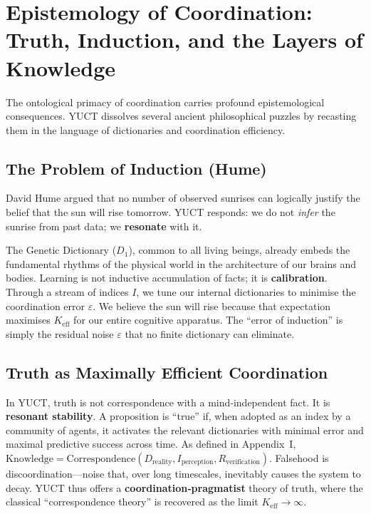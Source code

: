 \documentclass[12pt,a4paper]{article}
\newcommand{\Keff}{K_{\mathrm{eff}}}
\begin{document}
	\section{Epistemology of Coordination: Truth, Induction, and the Layers of Knowledge}
	\label{sec:epistemology}
	
	The ontological primacy of coordination carries profound epistemological consequences. YUCT dissolves several ancient philosophical puzzles by recasting them in the language of dictionaries and coordination efficiency.
	
	\subsection{The Problem of Induction (Hume)}
	
	David Hume argued that no number of observed sunrises can logically justify the belief that the sun will rise tomorrow. YUCT responds: we do not \emph{infer} the sunrise from past data; we \textbf{resonate} with it.
	
	The Genetic Dictionary (\(D_1\)), common to all living beings, already embeds the fundamental rhythms of the physical world in the architecture of our brains and bodies. Learning is not inductive accumulation of facts; it is \textbf{calibration}. Through a stream of indices \(I\), we tune our internal dictionaries to minimise the coordination error \(\varepsilon\). We believe the sun will rise because that expectation maximises \(\Keff\) for our entire cognitive apparatus. The ``error of induction'' is simply the residual noise \(\varepsilon\) that no finite dictionary can eliminate.
	
	\subsection{Truth as Maximally Efficient Coordination}
	
	In YUCT, truth is not correspondence with a mind‑independent fact. It is \textbf{resonant stability}. A proposition is ``true'' if, when adopted as an index by a community of agents, it activates the relevant dictionaries with minimal error and maximal predictive success across time. As defined in Appendix~I, \(\text{Knowledge} = \text{Correspondence}(D_{\text{reality}}, I_{\text{perception}}, R_{\text{verification}})\). Falsehood is discoordination---noise that, over long timescales, inevitably causes the system to decay. YUCT thus offers a \textbf{coordination‑pragmatist} theory of truth, where the classical ``correspondence theory'' is recovered as the limit \(\Keff \to \infty\).
	
\end{document}
